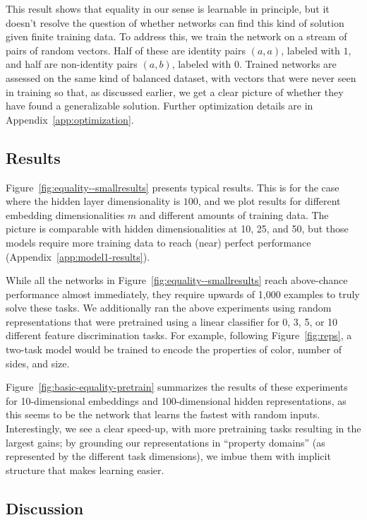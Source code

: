 \documentclass{article}
\newcommand{\Figref}[1]{Figure~\ref{#1}}
\newcommand{\figref}[1]{Figure~\ref{#1}}
\newcommand{\appref}[1]{Appendix~\ref{#1}}
\begin{document}
This result shows that equality in our sense is learnable in principle, but it doesn't resolve the question of whether networks can find this kind of solution given finite training data. To address this, we train the network on a stream of pairs of random vectors. Half of these are identity pairs $(a, a)$, labeled with $1$, and half are non-identity pairs $(a, b)$, labeled with $0$. Trained networks are assessed on the same kind of balanced dataset, with vectors that were never seen in training so that, as discussed earlier, we get a clear picture of whether they have found a generalizable solution. Further optimization details are in \appref{app:optimization}.



\subsection{Results}

\Figref{fig:equality--smallresults} presents typical results. This is for the case where the hidden layer dimensionality is $100$, and we plot results for different embedding dimensionalities $m$ and different amounts of training data. The picture is comparable with hidden dimensionalities at 10, 25, and 50, but those models require more training data to reach (near) perfect performance (\appref{app:model1-results}).

While all the networks in \figref{fig:equality--smallresults} reach above-chance performance almost immediately, they require upwards of 1,000 examples to truly solve these tasks. We additionally ran the above experiments using random representations that were pretrained using a linear classifier for 0, 3, 5, or 10 different feature discrimination tasks. For example, following \figref{fig:reps}, a two-task model would be trained to encode the properties of color, number of sides, and size.

\Figref{fig:basic-equality-pretrain} summarizes the results of these experiments for 10-dimensional embeddings and 100-dimensional hidden representations, as this seems to be the network that learns the fastest with random inputs. Interestingly, we see a clear speed-up, with more pretraining tasks resulting in the largest gains; by grounding our representations in ``property domains'' (as represented by the different task dimensions), we imbue them with implicit structure that makes learning easier.

\subsection{Discussion}
\end{document}
